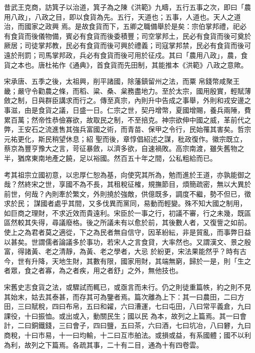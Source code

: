 
\begin{pinyinscope}

 昔武王克商，訪箕子以治道，箕子為之陳《洪範》九疇，五行五事之次，即曰「農用八政」，八政之目，即以食貨為先。五行，天道也；五事，人道也。天人之道治，而國家之政興
 焉。是故食貨而下，五卿之職備舉於是矣：宗伯掌邦禮，祀必有食貨而後儀物備，賓必有食貨而後委積豐；司空掌邦土，民必有食貨而後可奠於厥居；司徒掌邦教，民必有食貨而後可興於禮義；司寇掌邦禁，民必有食貨而後可遠於刑罰；司馬掌邦政，兵必有食貨而後可用於征戍。其曰「農用八政」，農，食貨之本也。唐杜祐作《通典》，首食貨而先田制，其能推本《洪範》八政之意歟。



 宋承唐、五季之後，太祖興，削平諸國，除藩鎮留州之法，而粟
 帛錢幣咸聚王畿；嚴守令勸農之條，而稻、粱、桑、枲務盡地力。至於太宗，國用殷實，輕賦薄斂之制，日與群臣講求而行之。傳至真宗，內則升中告成之事舉，外則和戎安邊之事滋，由是食貨之議，日盛一日。仁宗之世，契丹增幣，夏國增賜，養兵兩陲，費累百萬；然帝性恭儉寡欲，故取民之制，不至掊克。神宗欲伸中國之威，革前代之弊，王安石之流進售其強兵富國之術，而青苗、保甲之令行，民始罹其害矣。哲宗元祐更化，斯民稍望休息；紹
 聖而後，章惇倡紹述之謀，秕政復作。徽宗既立，蔡京為豐亨豫大之言，苛征暴斂，以濟多欲，自速禍敗。高宗南渡，雖失舊物之半，猶席東南地產之饒，足以裕國。然百五十年之間，公私粗給而已。



 考其祖宗立國初意，以忠厚仁恕為基，向使究其所為，勉而進於王道，亦孰能御之哉？然終宋之世，享國不為不長，其租稅征榷，規撫節目，煩簡疏密，無以大異於前世，何哉？內則牽於繁文，外則撓於強敵，供億既多，調度不繼，勢不但已，徵求於民；
 謀國者處乎其間，又多伐異而黨同，易動而輕變。殊不知大國之制用，如巨商之理財，不求近效而貴遠利。宋臣於一事之行，初議不審，行之未幾，既區區然較其失得，尋議廢格。後之所議未有以愈於前，其後數人者，又復訾之如前。使上之為君者莫之適從，下之為民者無自信守，因革紛紜，非是貿亂，而事弊日益以甚矣。世謂儒者論議多於事功，若宋人之言食貸，大率然也。又謂漢文、景之殷富，得諸黃、老之清靜，為黃、老之學者，大忌
 於紛更，宋法果能然乎？時有古今，世有升降，天地生財，其數有限，國家用財，其端無窮，歸於一是，則「生之者眾，食之者寡，為之者疾，用之者舒」之外，無他技也。



 宋舊史志食貨之法，或驟試而輒已，或亟言而未行。仍之則徒重篇帙，約之則不見其始末，姑去其泰甚，而存其可為鑒者焉。篇次離為上下：其一曰農田，二曰方田，三曰賦稅，四曰布帛，五曰和糴，六曰漕運，七曰屯田，八曰常平義倉，九曰課役，十曰振恤。或出或入，動關民生；國以民
 為本，故列之上篇焉。其一曰會計，二曰銅鐵錢，三曰會子，四曰鹽，五曰茶，六曰酒，七曰坑冶，八曰礬，九曰商稅，十曰市易，十一曰均輸，十二曰互市舶法。或損或益，有系國體；國不以利為利，故列之下篇焉。各疏其事，二十有二目，通為十有四卷雲。




\end{pinyinscope}
